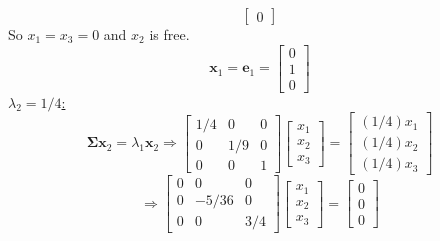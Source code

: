 \begin{enumerate}[font=\bfseries]
\begin{enumerate}
\[\begin{bmatrix}
                    0
                \end{bmatrix}
            \]
            So $x_1 = x_3 = 0$ and $x_2$ is free.
            \[
                \mathbf{x}_1
                =
                \mathbf{e}_1
                =
                \begin{bmatrix}
                    0 \\
                    1 \\
                    0
                \end{bmatrix}
            \]
            \underline{$\lambda_2 = 1/4$:}
            \[
                \mathbf{\Sigma}\mathbf{x}_2 = \lambda_1\mathbf{x}_2
                \Rightarrow
                \begin{bmatrix}
                    1/4 & 0 & 0\\
                    0 & 1/9 & 0\\
                    0 & 0 & 1
                \end{bmatrix}
                \begin{bmatrix}
                    x_1 \\
                    x_2 \\
                    x_3
                \end{bmatrix}
                =
                \begin{bmatrix}
                    (1/4)x_1 \\
                    (1/4)x_2 \\
                    (1/4)x_3
                \end{bmatrix}
            \]
            \[
                \Rightarrow
                \begin{bmatrix}
                    0 & 0 & 0\\
                    0 & -5/36 & 0\\
                    0 & 0 & 3/4
                \end{bmatrix}
                \begin{bmatrix}
                    x_1 \\
                    x_2 \\
                    x_3
                \end{bmatrix}
                =
                \begin{bmatrix}
                    0 \\
                    0 \\
                    0

\end{bmatrix}\]
\end{enumerate}
\end{enumerate}
